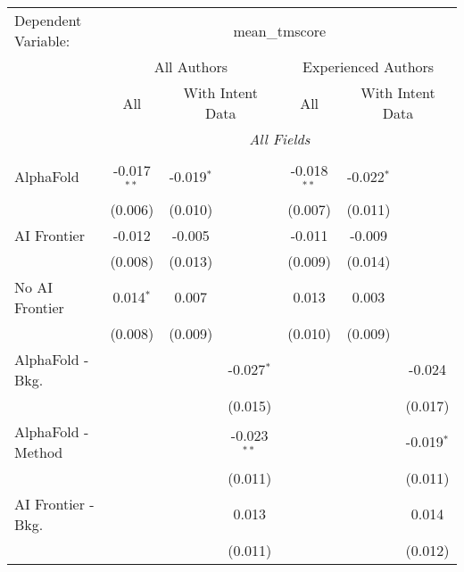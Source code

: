 \begingroup
\centering
\begin{tabular}{lcccccc}
   \tabularnewline \midrule \midrule
   Dependent Variable: & \multicolumn{6}{c}{mean\_tmscore}\\
 & \multicolumn{3}{c}{All Authors} & \multicolumn{3}{c}{Experienced Authors} \\
\cmidrule(lr){2-4} \cmidrule(lr){5-7}
 & \multicolumn{1}{c}{All} & \multicolumn{2}{c}{With Intent Data} & \multicolumn{1}{c}{All} & \multicolumn{2}{c}{With Intent Data} \\
\cmidrule(lr){2-2} \cmidrule(lr){3-4} \cmidrule(lr){5-5} \cmidrule(lr){6-7}
 & \multicolumn{6}{c}{\textit{All Fields}} \\ \\
   AlphaFold               & -0.017$^{**}$ & -0.019$^{*}$ &               & -0.018$^{**}$ & -0.022$^{*}$ &   \\   
                           & (0.006)       & (0.010)      &               & (0.007)       & (0.011)      &   \\   
   AI Frontier             & -0.012        & -0.005       &               & -0.011        & -0.009       &   \\   
                           & (0.008)       & (0.013)      &               & (0.009)       & (0.014)      &   \\   
   No AI Frontier          & 0.014$^{*}$   & 0.007        &               & 0.013         & 0.003        &   \\   
                           & (0.008)       & (0.009)      &               & (0.010)       & (0.009)      &   \\   
   AlphaFold - Bkg.        &               &              & -0.027$^{*}$  &               &              & -0.024\\   
                           &               &              & (0.015)       &               &              & (0.017)\\   
   AlphaFold - Method      &               &              & -0.023$^{**}$ &               &              & -0.019$^{*}$\\   
                           &               &              & (0.011)       &               &              & (0.011)\\   
   AI Frontier - Bkg.      &               &              & 0.013         &               &              & 0.014\\   
                           &               &              & (0.011)       &               &              & (0.012)\\   

\end{tabular}
